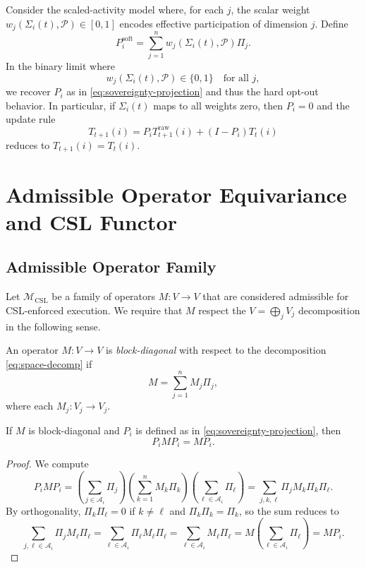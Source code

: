 \documentclass[11pt]{article}
\begin{document}
Consider the scaled-activity model where, for each $j$, the scalar weight $w_j(\Sigma_i(t),\mathcal{P}) \in [0,1]$ encodes effective participation of dimension $j$.
Define
\[
  P_i^{\mathrm{soft}}
    = \sum_{j=1}^n w_j(\Sigma_i(t),\mathcal{P}) \Pi_j.
\]
In the binary limit where
\[
  w_j(\Sigma_i(t),\mathcal{P}) \in \{0,1\}
  \quad\text{for all } j,
\]
we recover $P_i$ as in \eqref{eq:sovereignty-projection} and thus the hard opt-out behavior.
In particular, if $\Sigma_i(t)$ maps to all weights zero, then $P_i = 0$ and the update rule
\[
  T_{t+1}(i) = P_i T_{t+1}^{\text{raw}}(i) + (I - P_i) T_t(i)
\]
reduces to $T_{t+1}(i) = T_t(i)$.

\section{Admissible Operator Equivariance and CSL Functor}

\subsection{Admissible Operator Family}

Let $\mathcal{M}_{\mathrm{CSL}}$ be a family of operators $M : V \to V$ that are considered admissible for CSL-enforced execution.
We require that $M$ respect the $V = \bigoplus_j V_j$ decomposition in the following sense.

\begin{definition}
An operator $M : V \to V$ is \emph{block-diagonal} with respect to the decomposition \eqref{eq:space-decomp} if
\[
  M = \sum_{j=1}^n M_j \Pi_j,
\]
where each $M_j : V_j \to V_j$.
\end{definition}

\begin{lemma}
If $M$ is block-diagonal and $P_i$ is defined as in \eqref{eq:sovereignty-projection}, then
\[
  P_i M P_i = M P_i.
\]
\end{lemma}

\begin{proof}
We compute
\[
  P_i M P_i
   = \left( \sum_{j\in\mathcal{A}_i} \Pi_j \right)
     \left( \sum_{k=1}^n M_k \Pi_k \right)
     \left( \sum_{\ell\in\mathcal{A}_i} \Pi_\ell \right)
   = \sum_{j,k,\ell} \Pi_j M_k \Pi_k \Pi_\ell.
\]
By orthogonality, $\Pi_k \Pi_\ell = 0$ if $k \ne \ell$ and $\Pi_k \Pi_k = \Pi_k$, so the sum reduces to
\[
  \sum_{j,\ell \in \mathcal{A}_i} \Pi_j M_\ell \Pi_\ell
  = \sum_{\ell \in \mathcal{A}_i} \Pi_\ell M_\ell \Pi_\ell
  = \sum_{\ell \in \mathcal{A}_i} M_\ell \Pi_\ell
  = M \left( \sum_{\ell\in\mathcal{A}_i} \Pi_\ell \right)
  = M P_i.
\]
\end{proof}
\end{document}
